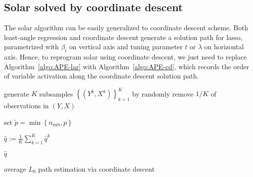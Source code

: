 \documentclass[12pt]{article}
\begin{document}
\subsection{Solar solved by coordinate descent}

The solar algorithm can be easily generalized to coordinate descent scheme. Both least-angle regression and coordinate descent generate a solution path for lasso, parametrized with $\beta_i$ on vertical axis and tuning parameter $t$ or $\lambda$ on horizontal axis. Hence, to reprogram solar using coordinate descent, we just need to replace Algorithm~\ref{algo:APE-lar} with Algorithm~\ref{algo:APE-cd}, which records the order of variable activation along the coordinate descent solution path.

\smallskip
\begin{algorithm}[h]


  \smallskip

  generate $K$ subsamples $\left\{ \left( Y^k, X^k \right) \right\}^{K}_{k=1}$ by randomly remove $1/K$ of observations in $\left( Y, X \right)$\;

  set $\widetilde{p} = \min\left\{ n_{\mathrm{sub}}, p \right\}$ \;

  \For{ k := 1 to K, stepsize = 1 \nllabel{outer_averaging_start} }{

    denote $\lambda_s$ as the $\lambda$ value that coordinate descent lasso includes $s$ variables, $\forall s \in \left(0, \widetilde{p}\right]$; 

    run a coordinate descent lasso on $\left( Y^k, X^k \right)$, $\forall \lambda \in \left\{\lambda_1, \ldots, \lambda_{\widetilde{p}},\right\}$
    
    record the order of variable inclusion at each $\lambda \in \left\{ \lambda_1, \ldots, \lambda_{\widetilde{p}},\right\}$\;

    define $\widehat{q}^k = \mathbf{0} \in \mathbb{R}^p$\;

    for all $i$ and $s$, if $\mathbf{x}_i$ is included at $\lambda = \lambda_s$, set $\widehat{q}^k_i= (\widetilde{p} + 1 - s) / \widetilde{p}$, where $\widehat{q}^k_i$ is the $i$\textsuperscript{th} entry of $\widehat{q}^k$\;

  }

  $\widehat{q} := \frac{1}{K} \sum_{k=1}^{K} \widehat{q}^k$\; 

  \Return $\widehat{q}$

\caption{average $L_0$ path estimation via coordinate descent \label{algo:APE-cd}}

\end{algorithm}
\end{document}
